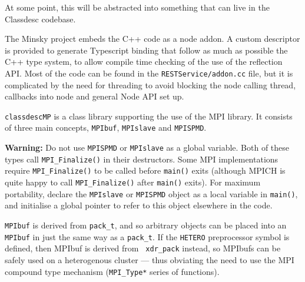 At some point, this will be abstracted into something that can live in
the Classdesc codebase.


The Minsky project embeds the C++ code as a node addon. A custom
descriptor is provided to generate Typescript binding that follow as
much as possible the C++ type system, to allow compile time checking
of the use of the reflection API. Most of the code can be found in the
\verb+RESTService/addon.cc+ file, but it is complicated by the need
for threading to avoid blocking the node calling thread, callbacks
into node and general Node API set up.


{\tt classdescMP} is a class library supporting the use of the MPI
library. It consists of three main concepts, {\tt MPIbuf},
{\tt MPIslave} and {\tt MPISPMD}.

{\bf Warning:} Do not use {\tt MPISPMD} or {\tt MPIslave} as a global
variable. Both of these types call \verb+MPI_Finalize()+ in their
destructors. Some MPI implementations require \verb+MPI_Finalize()+ to
be called before \verb+main()+ exits (although MPICH is quite happy to
call \verb+MPI_Finalize()+ after \verb+main()+ exits). For maximum
portability, declare the {\tt MPIslave} or {\tt MPISPMD} object as a
local variable in \verb+main()+, and initialise a global pointer to
refer to this object elsewhere in the code.


{\tt MPIbuf} is derived from {\tt pack\_t}, and so
arbitrary objects can be placed into an {\tt MPIbuf} in just the same
way as a {\tt pack\_t}. If the \verb+HETERO+
preprocessor symbol is defined, then MPIbuf is derived from {\tt
xdr\_pack} instead, so MPIbufs can be safely used on
a heterogenous cluster --- thus obviating the need to use the MPI
compound type mechanism ({\tt MPI\_Type*} series of functions).

